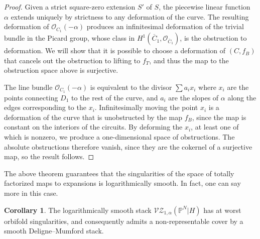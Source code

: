 \documentclass[11pt]{amsart}
\renewcommand{\to}{\rightarrow}
\theoremstyle{definition}
\newtheorem{cor}[thm]{Corollary}
\theoremstyle{definition}
\begin{document}
\begin{proof}
Given a strict square-zero extension $S'$ of $S$, the piecewise linear function $\alpha$ extends uniquely by strictness to any deformation of the curve. The resulting deformation of $\mathcal O_{C_1}(-\alpha)$ produces an infinitesimal deformation of the trivial bundle in the Picard group, whose class in $H^1(\overline{C}_1,\mathcal O_{\overline{C}_1})$, is the obstruction to deformation. We will show that it is possible to choose a deformation of $(C,f_B)$ that cancels out the obstruction to lifting to $f_T$, and thus the map to the obstruction space above is surjective. 

The line bundle $\mathcal O_{C_1}(-\alpha)$ is equivalent to the divisor $\sum a_i x_i$ where $x_i$ are the points connecting $D_1$ to the rest of the curve, and $a_i$ are the slopes of $\alpha$ along the edges corresponding to the $x_i$. Infinitesimally moving the point $x_i$ is a deformation of the curve that is unobstructed by the map $f_B$, since the map is constant on the interiors of the circuits. By deforming the $x_i$, at least one of which is nonzero, we produce a one-dimensional space of obstructions. The absolute obstructions therefore vanish, since they are the cokernel of a surjective map, so the result follows.  

\end{proof}

The above theorem guarantees that the singularities of the space of totally factorized maps to expansions is logarithmically smooth. In fact, one can say more in this case.

\begin{cor}
The logarithmically smooth stack $\mathcal{VZ}_{1,\alpha}(\mathbb P^N|H)$ has at worst orbifold singularities, and consequently admits a non-representable cover by a smooth Deligne--Mumford stack.
\end{cor}
\end{document}
